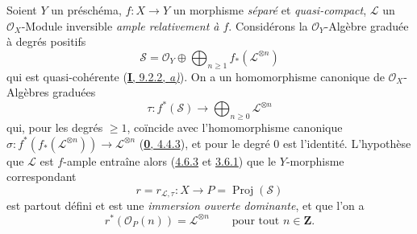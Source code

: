 \begin{env}[8.8.1]
\label{II.8.8.1-fr}
Soient $Y$ un préschéma, $f:X\to Y$ un morphisme \emph{séparé} et
\emph{quasi-compact}, $\mathcal{L}$ un $\mathcal{O}_X$-Module inversible \emph{ample
relativement à $f$}. Considérons la $\mathcal{O}_Y$-Algèbre graduée à degrés
positifs
\begin{equation}
\label{II.8.8.1.1-fr}
  \mathcal{S}=\mathcal{O}_Y\oplus
  \bigoplus_{n\geqslant 1}f_*(\mathcal{L}^{\otimes n})
\tag{8.8.1.1}
\end{equation}
qui est quasi-cohérente (\hyperref[I.9.2.2-fr]{\textbf{I}, 9.2.2, \emph{a)}}). On a un
homomorphisme canonique de $\mathcal{O}_X$-Algèbres graduées
\begin{equation}
\label{II.8.8.1.2-fr}
  \tau:f^*(\mathcal{S})\longrightarrow
  \bigoplus_{n\geqslant 0}\mathcal{L}^{\otimes n}
\tag{8.8.1.2}
\end{equation}
qui, pour les degrés $\geqslant 1$, coïncide avec l'homomorphisme canonique
$\sigma:f^*(f_*(\mathcal{L}^{\otimes n}))\to\mathcal{L}^{\otimes n}$
(\hyperref[0.4.4.3-fr]{\textbf{0}, 4.4.3}), et pour le degré $0$ est l'identité.
L'hypothèse que $\mathcal{L}$ est $f$-ample entraîne alors
(\hyperref[II.4.6.3-fr]{4.6.3} et \hyperref[II.3.6.1-fr]{3.6.1}) que le
$Y$-morphisme correspondant
\begin{equation}
\label{II.8.8.1.3-fr}
  r=r_{\mathcal{L},\tau}:X\longrightarrow
  P=\operatorname{Proj}(\mathcal{S})
\tag{8.8.1.3}
\end{equation}
est partout défini et est une \emph{immersion ouverte dominante}, et que l'on
a
\begin{equation}
\label{II.8.8.1.4-fr}
  r^*(\mathcal{O}_P(n))=\mathcal{L}^{\otimes n}
  \qquad\text{pour tout }n\in\mathbf{Z}.
\tag{8.8.1.4}
\end{equation}
\end{env}

